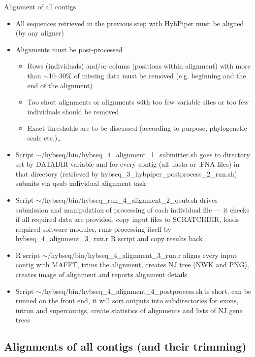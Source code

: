 \documentclass[compress, ucs, xelatex, 11pt, xcolor=x11names, aspectratio=169,
	hyperref={
		bookmarks=true,
		unicode=true,
		colorlinks=true,
		pdftitle={HybSeq course},
		plainpages=false,
		pdfauthor={Vojtech Zeisek},
		pdfsubject={Practical processing of HybSeq target enrichment sequencing data on computing grids like MetaCentrum},
		pdfcreator={XeLaTeX},
		pdfkeywords={BASH, command line, GNU, HybSeq, Linux, MetaCentrum, sequencing shell, target enrichment},
		linkcolor=Turquoise4, %
		anchorcolor=DodgerBlue4, %
		citecolor=DodgerBlue4, %
		filecolor=DodgerBlue4, %
		menucolor=Tan4, %
		urlcolor=DarkOliveGreen4, %
		pdftex},
	url={hyphens, lowtilde} %
	]{beamer}
\renewcommand{\texttt}[1]{\colorbox{Cornsilk2}{{\ttfamily #1}}}
\begin{document}
\begin{frame}[allowframebreaks]{Alignment of all contigs}
	\begin{itemize}
		\item All sequences retrieved in the previous step with HybPiper must be aligned (by any aligner)
		\item Alignments must be post-processed
		\begin{itemize}
			\item Rows (individuals) and/or colums (positions within alignment) with more than $\sim$10--30\% of missing data must be removed (e.g. beginning and the end of the alignment)
			\item Too short alignments or alignments with too few variable sites or too few individuals should be removed
			\item Exact thresholds are to be discussed (according to purpose, phylogenetic scale etc.)\ldots
		\end{itemize}
		\item Script \texttt{$\sim$/hybseq/bin/hybseq\_4\_alignment\_1\_submitter.sh} goes to directory set by \texttt{DATADIR} variable and for every contig (all \texttt{*.fasta} or \texttt{*.FNA} files) in that directory (retrieved by \texttt{hybseq\_3\_hybpiper\_postprocess\_2\_run.sh}) submits via \texttt{qsub} individual alignment task
		\item Script \texttt{$\sim$/hybseq/bin/hybseq\_run\_4\_alignment\_2\_qsub.sh} drives submission and manipulation of processing of each individual file --- it checks if all required data are provided, copy input files to \texttt{SCRATCHDIR}, loads required software modules, runs processing itself by \texttt{hybseq\_4\_alignment\_3\_run.r} \texttt{R} script and copy results back
		\item \texttt{R} script \texttt{$\sim$/hybseq/bin/hybseq\_4\_alignment\_3\_run.r} aligns every input contig with \href{https://mafft.cbrc.jp/alignment/software/}{MAFFT}, trims the alignment, creates NJ tree (NWK and PNG), creates image of alignment and reports alignment details
		\item Script \texttt{$\sim$/hybseq/bin/hybseq\_4\_alignment\_4\_postprocess.sh} is short, can be runned on the front end, it will sort outputs into subdirectories for exons, intron and supercontigs, create statistics of alignments and lists of NJ gene trees
	\end{itemize}
\end{frame}

\subsection{Alignments of all contigs (and their trimming)}
\end{document}
